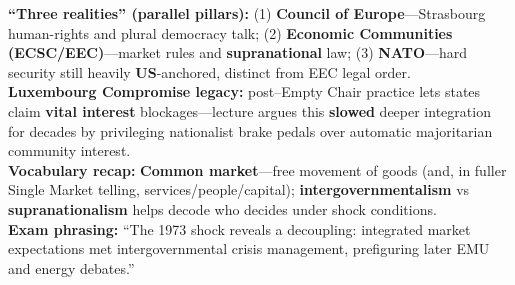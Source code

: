 \documentclass[10pt,a4paper]{article}
\begin{document}
{\textbf{``Three realities'' (parallel pillars):} (1) \textbf{Council of Europe}---Strasbourg human-rights and plural democracy talk; (2) \textbf{Economic Communities (ECSC/EEC)}---market rules and \textbf{supranational} law; (3) \textbf{NATO}---hard security still heavily \textbf{US}-anchored, distinct from EEC legal order.\\
\textbf{Luxembourg Compromise legacy:} post--Empty Chair practice lets states claim \textbf{vital interest} blockages---lecture argues this \textbf{slowed} deeper integration for decades by privileging nationalist brake pedals over automatic majoritarian community interest.\\
\textbf{Vocabulary recap:} \textbf{Common market}---free movement of goods (and, in fuller Single Market telling, services/people/capital); \textbf{intergovernmentalism} vs \textbf{supranationalism} helps decode who decides under shock conditions.\\
\textbf{Exam phrasing:} ``The 1973 shock reveals a decoupling: integrated market expectations met intergovernmental crisis management, prefiguring later EMU and energy debates.''
}
\end{document}
